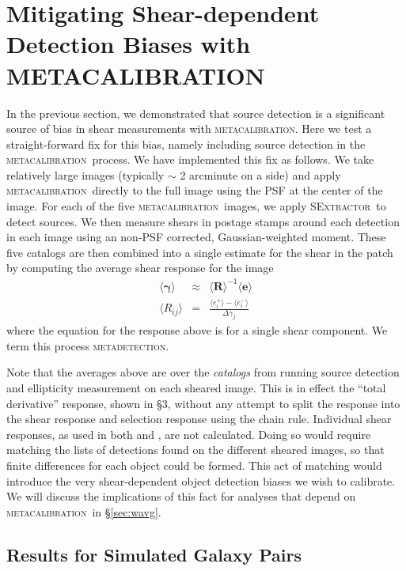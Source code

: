 \documentclass[fleqn,useAMS,usenatbib]{mnras}
\newcommand{\mcal}{\textsc{metacalibration}}
\newcommand{\mdet}{\textsc{metadetection}}
\newcommand{\sx}{\textsc{SExtractor}}
\begin{document}
\section{Mitigating Shear-dependent Detection Biases with \textsc{METACALIBRATION}}
\label{sec:mitigate}

In the previous section, we demonstrated that source detection is a significant
source of bias in shear measurements with \mcal. Here we test a straight-forward
fix for this bias, namely including source detection in the \mcal\ process. We
have implemented this fix as follows. We take relatively large images (typically
$\sim$ 2 arcminute on a side) and apply \mcal\ directly to the full image using the
PSF at the center of the image. For each of the five \mcal\ images, we apply
\sx\ to detect sources. We then measure shears in postage stamps around each
detection in each image using an non-PSF corrected, Gaussian-weighted moment.
These five catalogs are then combined into a single estimate for the shear in
the patch by computing the average shear response for the image
\begin{eqnarray}
\langle \boldsymbol\gamma \rangle &\approx& \langle \boldsymbol{R}\rangle^{-1}\langle\boldsymbol{e}\rangle\\
\langle R_{ij}\rangle &=& \frac{\langle e_i^{+}\rangle - \langle e_i^{-}\rangle}{\Delta\gamma_j}
\end{eqnarray}
where the equation for the response above is for a single shear component. We term this
process \mdet.

Note that the averages above are over the {\it catalogs} from running source
detection and ellipticity measurement on each sheared image. This is in effect
the ``total derivative'' response, shown in \cite{SheldonMcal2017} \S 3,
without any attempt to split the response into the shear response and selection
response using the chain rule.  Individual shear responses, as used in both
\cite{SheldonMcal2017} and \cite{HuffMcal2017}, are not calculated.  Doing so
would require matching the lists of detections found on the different sheared
images, so that finite differences for each object could be formed.  This act
of matching would introduce the very shear-dependent object detection biases we
wish to calibrate.  We will discuss the implications of this fact for analyses
that depend on \mcal\ in \S \ref{sec:wavg}.

\subsection{Results for Simulated Galaxy Pairs}
\label{sec:mdetpairs}
\end{document}
